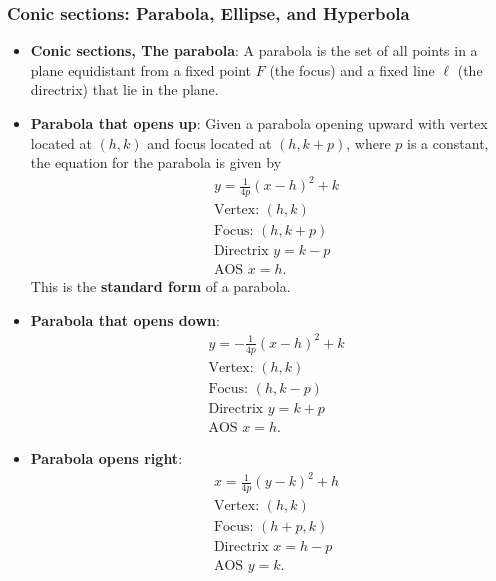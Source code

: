 \documentclass{report}
\begin{document}
    \subsubsection{Conic sections: Parabola, Ellipse, and Hyperbola}
    \begin{itemize}
    \item \textbf{Conic sections, The parabola}:
      A parabola is the set of all points in a plane equidistant from a fixed point $F$ (the focus) and a fixed line $\ell$ (the directrix) that lie in the plane.
    \item \textbf{Parabola that opens up}:
        Given a parabola opening upward with vertex located at  $(h,k)$ and focus located at  $(h,k+p)$, where $p$ is a constant, the equation for the parabola is given by
        \begin{align*}
            &y= \frac{1}{4p}(x-h)^{2} + k \\
              &\text{Vertex: } (h,k) \\
              &\text{Focus: } (h,k+p) \\
              &\text{Directrix } y = k-p \\
              &\text{AOS } x=h
        .\end{align*}
        This is the \textbf{standard form} of a parabola.
        \bigbreak \noindent 
    \item \textbf{Parabola that opens down}:
        \begin{align*}
            &y = -\frac{1}{4p}(x-h)^{2} + k \\
              &\text{Vertex: } (h,k) \\
              &\text{Focus: } (h,k-p) \\
              &\text{Directrix } y = k+p \\
              &\text{AOS } x=h
        .\end{align*}
        \bigbreak \noindent 
    \item \textbf{Parabola opens right}:
        \begin{align*}
            &x= \frac{1}{4p}(y-k)^{2} + h \\
            &\text{Vertex: } (h,k) \\
            &\text{Focus: } (h+p,k) \\
            &\text{Directrix } x=h-p \\
            &\text{AOS } y=k
        .\end{align*}
        \bigbreak \noindent 

\end{itemize}
\end{document}
